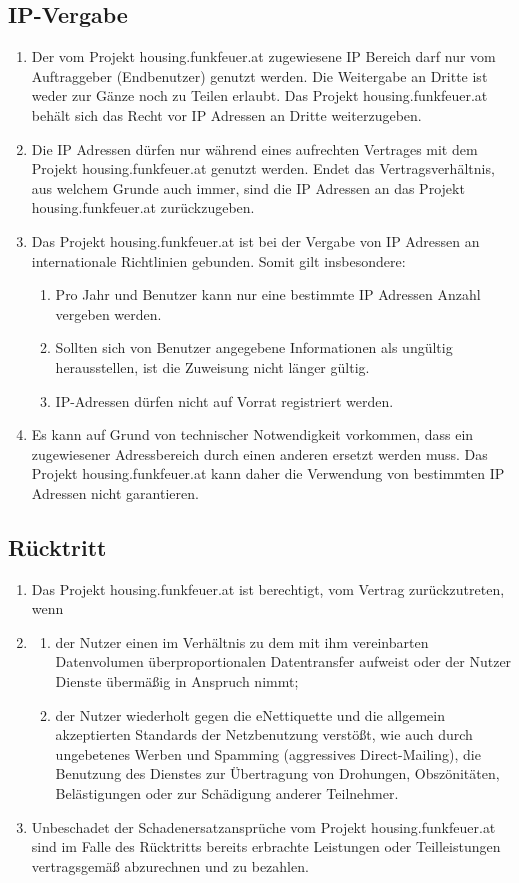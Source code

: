 \documentclass[parskip=half]{article}
\begin{document}
\subsection{IP-Vergabe}
\begin{enumerate}
\item Der vom Projekt housing.funkfeuer.at zugewiesene IP Bereich darf nur vom Auftraggeber
(Endbenutzer) genutzt werden. Die Weitergabe an Dritte ist weder zur Gänze noch zu
Teilen erlaubt. Das Projekt housing.funkfeuer.at behält sich das Recht vor IP Adressen an
Dritte weiterzugeben.
\item Die IP Adressen dürfen nur während eines aufrechten Vertrages mit dem Projekt
housing.funkfeuer.at genutzt werden. Endet das Vertragsverhältnis, aus welchem Grunde
auch immer, sind die IP Adressen an das Projekt housing.funkfeuer.at zurückzugeben.
\newpage
\item Das Projekt housing.funkfeuer.at ist bei der Vergabe von IP Adressen an internationale
Richtlinien gebunden. Somit gilt insbesondere:
\begin{enumerate}
\item Pro Jahr und Benutzer kann nur eine bestimmte IP Adressen Anzahl vergeben werden.
\item Sollten sich von Benutzer angegebene Informationen als ungültig herausstellen, ist die
Zuweisung nicht länger gültig.
\item IP-Adressen dürfen nicht auf Vorrat registriert werden.
\end{enumerate}
\item Es kann auf Grund von technischer Notwendigkeit vorkommen, dass ein zugewiesener
Adressbereich durch einen anderen ersetzt werden muss. Das Projekt housing.funkfeuer.at
kann daher die Verwendung von bestimmten IP Adressen nicht garantieren.
\end{enumerate}

\subsection{ Rücktritt}
\begin{enumerate}
\item[] Das Projekt housing.funkfeuer.at ist berechtigt, vom Vertrag zurückzutreten, wenn
\item\begin{enumerate}
\item der Nutzer einen im Verhältnis zu dem mit ihm vereinbarten Datenvolumen
überproportionalen Datentransfer aufweist oder der Nutzer Dienste übermäßig in
Anspruch nimmt;
\item der Nutzer wiederholt gegen die eNettiquette und die allgemein akzeptierten Standards
der Netzbenutzung verstößt, wie auch durch ungebetenes Werben und Spamming
(aggressives Direct-Mailing), die Benutzung des Dienstes zur Übertragung von
Drohungen, Obszönitäten, Belästigungen oder zur Schädigung anderer Teilnehmer.
\end{enumerate}
\item Unbeschadet der Schadenersatzansprüche vom Projekt housing.funkfeuer.at sind im
Falle des Rücktritts bereits erbrachte Leistungen oder Teilleistungen vertragsgemäß
abzurechnen und zu bezahlen.
\end{enumerate}
\end{document}
